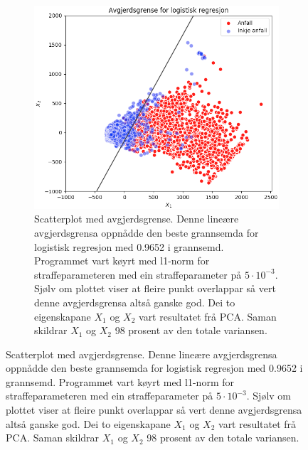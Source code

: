 \documentclass[oneside, nynorsk]{book}
\begin{document}
\begin{figure}[h!]
  \begin{subfigure}{\textwidth}
        \centering
        \centerline{\includegraphics[width=1\linewidth]{LR}}
        \caption{Scatterplot med avgjerdsgrense. Denne lineære avgjerdsgrensa oppnådde den beste grannsemda for logistisk regresjon med 0.9652 i grannsemd. Programmet vart køyrt med l1-norm for straffeparameteren med ein straffeparameter på $5 \cdot 10^{-3}$. Sjølv om plottet viser at fleire punkt overlappar så vert denne avgjerdsgrensa altså ganske god. Dei to eigenskapane $X_1$ og $X_2$ vart resultatet frå PCA. Saman skildrar $X_1$ og $X_2$ 98 prosent av den totale variansen. }
        \label{LRPlot}
    \end{subfigure}
\end{figure}
\newpage\phantom{blabla}
\end{document}
